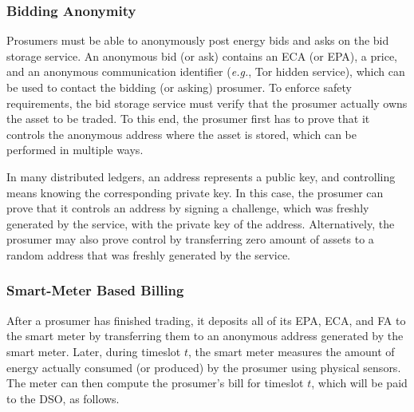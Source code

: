 \subsubsection{Bidding Anonymity}
Prosumers must be able to anonymously post energy bids and asks on the
bid storage service.  An anonymous bid (or ask) contains an ECA (or
EPA), a price, and an anonymous communication identifier (\emph{e.g.},
Tor hidden service), which can be used to contact the bidding (or
asking) prosumer.  To enforce safety requirements, the bid storage
service must verify that the prosumer actually owns the asset to be
traded.  To this end, the prosumer first has to prove that it controls
the anonymous address where the asset is stored, which can be
performed in multiple ways.

In many distributed ledgers, an address represents a public key, and
controlling means knowing the corresponding private key.  In this
case, the prosumer can prove that it controls an address by signing a
challenge, which was freshly generated by the service, with the
private key of the address.  Alternatively, the prosumer may also
prove control by transferring zero amount of assets to a random
address that was freshly generated by the service.


\subsubsection{Smart-Meter Based Billing}
After a prosumer has finished trading, it deposits all of its EPA,
ECA, and FA to the smart meter by transferring them to an anonymous
address generated by the smart meter.  Later, during timeslot $t$, the
smart meter measures the amount of energy actually consumed (or
produced) by the prosumer using physical sensors.  The meter can then
compute the prosumer's bill for timeslot $t$, which will be paid to
the DSO, as follows.

